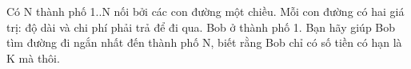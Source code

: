 Có N thành phố 1..N nối bởi các con đường một chiều. Mỗi con đường có hai giá trị: độ dài và chi phí phải trả để đi qua. Bob ở thành phố 1. Bạn hãy giúp Bob tìm đường đi ngắn nhất đến thành phố N, biết rằng Bob chỉ có số tiền có hạn là K mà thôi.  

\